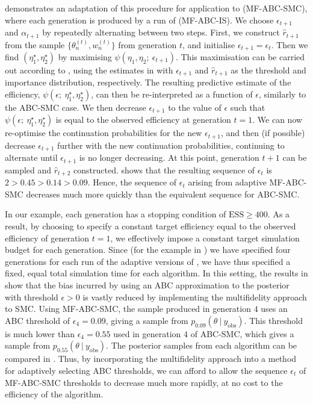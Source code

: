 \documentclass[12pt, onecolumn]{article}
\newcommand{\obs}[1]{#1_{\mathrm{obs}}}
\begin{document}
 demonstrates an adaptation of this procedure for application to  (MF-ABC-SMC), where each generation is produced by a run of  (MF-ABC-IS).
We choose $\epsilon_{t+1}$ and $\alpha_{t+1}$ by repeatedly alternating between two steps.
First, we construct $\hat r_{t+1}$ from the sample $\{ \theta_n^{(t)}, w_n^{(t)} \}$ from generation $t$, and initialise $\epsilon_{t+1} = \epsilon_t$.
Then we find $(\eta_1^\star, \eta_2^\star)$ by maximising $\psi(\eta_1,\eta_2;~\epsilon_{t+1})$.
This maximisation can be carried out according to , using the estimates in  with $\epsilon_{t+1}$ and $\hat r_{t+1}$ as the threshold and importance distribution, respectively.
The resulting predictive estimate of the efficiency, $\psi(\epsilon;~\eta_1^\star, \eta_2^\star)$, can then be re-interpreted as a function of $\epsilon$, similarly to the ABC-SMC case.
We then decrease $\epsilon_{t+1}$ to the value of $\epsilon$ such that $\psi(\epsilon;~\eta_1^\star,\eta_2^\star)$ is equal to the observed efficiency at generation $t=1$.
We can now re-optimise the continuation probabilities for the new $\epsilon_{t+1}$, and then (if possible) decrease $\epsilon_{t+1}$ further with the new continuation probabilities, continuing to alternate until $\epsilon_{t+1}$ is no longer decreasing.
At this point, generation $t+1$ can be sampled and $\hat r_{t+2}$ constructed.
 shows that the resulting sequence of $\epsilon_t$ is $2 > 0.45 > 0.14 > 0.09$.
Hence, the sequence of $\epsilon_t$ arising from adaptive MF-ABC-SMC decreases much more quickly than the equivalent sequence for ABC-SMC.

In our example, each generation has a stopping condition of $\mathrm{ESS} \geq 400$.
As a result, by choosing to specify a constant target efficiency equal to the observed efficiency of generation $t=1$, we effectively impose a constant target simulation budget for each generation.
Since (for the example in ) we have specified four generations for each run of the adaptive versions of , we have thus specified a fixed, equal total simulation time for each algorithm.
In this setting, the results in  show that the bias incurred by using an ABC approximation to the posterior with threshold $\epsilon>0$ is vastly reduced by implementing the multifidelity approach to SMC.
Using MF-ABC-SMC, the sample produced in generation $4$ uses an ABC threshold of $\epsilon_4 = 0.09$, giving a sample from $p_{0.09}(\theta~|~\obs y)$.
This threshold is much lower than $\epsilon_4 = 0.55$ used in generation $4$ of ABC-SMC, which gives a sample from $p_{0.55}(\theta~|~\obs y)$.
The posterior samples from each algorithm can be compared in .
Thus, by incorporating the multifidelity approach into a method for adaptively selecting ABC thresholds, we can afford to allow the sequence $\epsilon_t$ of MF-ABC-SMC thresholds to decrease much more rapidly, at no cost to the efficiency of the algorithm.
\end{document}

